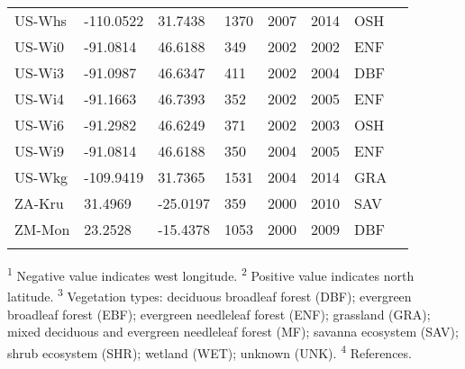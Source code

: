 \documentclass[a4paper, 12pt]{article}
\begin{document}
\begin{longtable}{l l l l l l l l}
US-Whs & -110.0522 & 31.7438 & 1370 & 2007 & 2014 & OSH & \cite{US-Whs} \\ 
US-Wi0 & -91.0814 & 46.6188 & 349 & 2002 & 2002 & ENF & \cite{US-Wi0} \\ 
US-Wi3 & -91.0987 & 46.6347 & 411 & 2002 & 2004 & DBF & \cite{US-Wi3} \\ 
US-Wi4 & -91.1663 & 46.7393 & 352 & 2002 & 2005 & ENF & \cite{US-Wi4} \\ 
US-Wi6 & -91.2982 & 46.6249 & 371 & 2002 & 2003 & OSH & \cite{US-Wi6} \\ 
US-Wi9 & -91.0814 & 46.6188 & 350 & 2004 & 2005 & ENF & \cite{US-Wi9} \\ 
US-Wkg & -109.9419 & 31.7365 & 1531 & 2004 & 2014 & GRA & \cite{US-Wkg} \\ 
ZA-Kru & 31.4969 & -25.0197 & 359 & 2000 & 2010 & SAV & \cite{ZA-Kru} \\ 
ZM-Mon & 23.2528 & -15.4378 & 1053 & 2000 & 2009 & DBF & \cite{ZM-Mon} \\ 
\hline  
\label{tab:longtable}  
\end{longtable} 
\textsuperscript{1} Negative value indicates west longitude. \textsuperscript{2} Positive value indicates north latitude. \textsuperscript{3} Vegetation types: deciduous broadleaf forest (DBF); evergreen broadleaf forest (EBF); evergreen needleleaf forest (ENF); grassland (GRA); mixed deciduous and evergreen needleleaf forest (MF); savanna ecosystem (SAV); shrub ecosystem (SHR); wetland (WET); unknown (UNK). \textsuperscript{4} References. 
\medskip 
 
 
\end{document}

